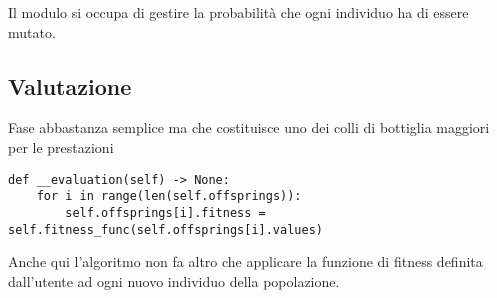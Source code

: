 Il modulo si occupa di gestire la probabilità che ogni individuo ha di essere
mutato.

\subsection{Valutazione}

Fase abbastanza semplice ma che costituisce uno dei colli di bottiglia maggiori
per le prestazioni

\begin{verbatim}
def __evaluation(self) -> None:
	for i in range(len(self.offsprings)):
		self.offsprings[i].fitness = self.fitness_func(self.offsprings[i].values)
\end{verbatim}

Anche qui l'algoritmo non fa altro che applicare la funzione di fitness definita
dall'utente ad ogni nuovo individuo della popolazione.
